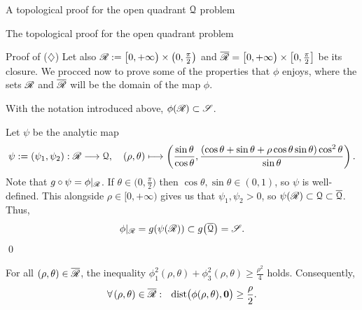 \documentclass[11pt, a4paper, english, twoside, notitlepage, openright]{report}
\begin{document}
\begin{chapter}{A topological proof for the open quadrant $\mathcal{Q}$ problem}
\begin{section}{The topological proof for the open quadrant problem}
\begin{subsection}{Proof of ($\diamondsuit$)}
Let also $\mathscr{R}:=\big[0,+\infty\big)\times\big(0,\tfrac{\pi}{2}\big)$ and $\overline{\mathscr{R}}=\big[0,+\infty\big)\times\big[0,\tfrac{\pi}{2}\big]$ be its closure. We procced now to prove some of the properties that $\phi$ enjoys, where the sets $\mathscr{R}$ and $\overline{\mathscr{R}}$ will be the domain of the map $\phi$.

\begin{lemma}\label{phiContainsS}
With the notation introduced above, $\phi(\mathscr{R})\subset\mathscr{S}$.
\begin{Proof}
Let $\psi$ be the analytic map
$$
\psi:=(\psi_1, \psi_2):\mathscr{R}\longrightarrow\mathcal{Q},\quad (\rho,\theta)\longmapsto \left(\frac{\sin\theta}{\cos\theta},\frac{(\cos\theta+\sin\theta+\rho\cos\theta
\sin\theta)\cos^2\theta}{\sin\theta}\right).
$$
Note that $g\circ\psi=\phi|_{\mathscr{R}}$. If $\theta\in\big(0,\tfrac{\pi}{2}\big)$ then $\cos\theta, \sin\theta \in(0,1)$, so $\psi$ is well-defined. This alongside $\rho\in[0,+\infty)$ gives us that $\psi_1, \psi_2>0$, so $\psi(\mathscr{R})\subset \mathcal{Q}\subset \overline{\mathcal{Q}}$. Thus, 
$$
\phi|_{\mathscr{R}}=g(\psi(\mathscr{R}))\subset g\big(\overline{\mathcal{Q}}\big)=\mathscr{S}.
$$
\qed
\end{Proof}
\end{lemma}

\begin{lemma}\label{phidist}
For all $(\rho,\theta)\in\overline{\mathscr{R}}$, the inequality $\phi_1^2(\rho,\theta)+\phi_3^2(\rho,\theta)\ge\frac{\rho^2}{4}$ holds. Consequently,
\begin{equation}\label{eq:ineqphi}
\forall (\rho,\theta)\in\overline{\Rr}:\ \ \text{dist}\big(\phi(\rho,\theta),{\bf0}\big)\geq\frac{\rho}{2}.
\end{equation}


\end{lemma}
\end{subsection}
\end{section}
\end{chapter}
\end{document}
